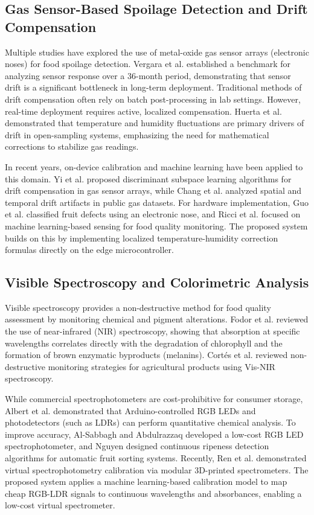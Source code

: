 \subsection{Gas Sensor-Based Spoilage Detection and Drift Compensation}
Multiple studies have explored the use of metal-oxide gas sensor arrays (electronic noses) for food spoilage detection. Vergara et al. \cite{UCI2016} established a benchmark for analyzing sensor response over a 36-month period, demonstrating that sensor drift is a significant bottleneck in long-term deployment. Traditional methods of drift compensation often rely on batch post-processing in lab settings. However, real-time deployment requires active, localized compensation. Huerta et al. \cite{Fonollosa2015} demonstrated that temperature and humidity fluctuations are primary drivers of drift in open-sampling systems, emphasizing the need for mathematical corrections to stabilize gas readings. 

In recent years, on-device calibration and machine learning have been applied to this domain. Yi et al. \cite{Yi2022} proposed discriminant subspace learning algorithms for drift compensation in gas sensor arrays, while Chang et al. \cite{Hosseinmardi2023} analyzed spatial and temporal drift artifacts in public gas datasets. For hardware implementation, Guo et al. \cite{Karadag2020} classified fruit defects using an electronic nose, and Ricci et al. \cite{Impedance2023} focused on machine learning-based sensing for food quality monitoring. The proposed system builds on this by implementing localized temperature-humidity correction formulas directly on the edge microcontroller.

\subsection{Visible Spectroscopy and Colorimetric Analysis}
Visible spectroscopy provides a non-destructive method for food quality assessment by monitoring chemical and pigment alterations. Fodor et al. \cite{Sun2018} reviewed the use of near-infrared (NIR) spectroscopy, showing that absorption at specific wavelengths correlates directly with the degradation of chlorophyll and the formation of brown enzymatic byproducts (melanins). Cort{\'e}s et al. \cite{NonDestructiveChlorophyll2022} reviewed non-destructive monitoring strategies for agricultural products using Vis-NIR spectroscopy.

While commercial spectrophotometers are cost-prohibitive for consumer storage, Albert et al. \cite{Albert2019} demonstrated that Arduino-controlled RGB LEDs and photodetectors (such as LDRs) can perform quantitative chemical analysis. To improve accuracy, Al-Sabbagh and Abdulrazzaq \cite{Wang2024} developed a low-cost RGB LED spectrophotometer, and Nguyen \cite{Nguyen2024} designed continuous ripeness detection algorithms for automatic fruit sorting systems. Recently, Ren et al. \cite{VirtualCalibration2023} demonstrated virtual spectrophotometry calibration via modular 3D-printed spectrometers. The proposed system applies a machine learning-based calibration model to map cheap RGB-LDR signals to continuous wavelengths and absorbances, enabling a low-cost virtual spectrometer.

